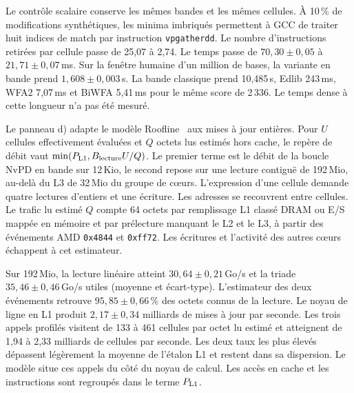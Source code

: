 Le contrôle scalaire conserve les mêmes bandes et les mêmes cellules. À 10\,\% de modifications synthétiques, les minima imbriqués permettent à GCC de traiter huit indices de match par instruction \texttt{vpgatherdd}. Le nombre d'instructions retirées par cellule passe de 25,07 à 2,74. Le temps passe de \(70{,}30\pm0{,}05\) à \(21{,}71\pm0{,}07\)\,ms. Sur la fenêtre humaine d'un million de bases, la variante en bande prend \(1{,}608\pm0{,}003\)\,s. La bande classique prend 10,485\,s, Edlib 243\,ms, WFA2 7,07\,ms et BiWFA 5,41\,ms pour le même score de 2\,336. Le temps dense à cette longueur n'a pas été mesuré.

Le panneau d) adapte le modèle Roofline~\cite{roofline} aux mises à jour entières. Pour \(U\) cellules effectivement évaluées et \(Q\) octets lus estimés hors cache, le repère de débit vaut \(\min(P_{\rm L1}, B_{\rm lecture} U/Q)\). Le premier terme est le débit de la boucle NvPD en bande sur 12\,Kio, le second repose sur une lecture contiguë de 192\,Mio, au-delà du L3 de 32\,Mio du groupe de cœurs. L'expression d'une cellule demande quatre lectures d'entiers et une écriture. Les adresses se recouvrent entre cellules. Le trafic lu estimé \(Q\) compte 64 octets par remplissage L1 classé DRAM ou E/S mappée en mémoire et par prélecture manquant le L2 et le L3, à partir des événements AMD \texttt{0x4844} et \texttt{0xff72}. Les écritures et l'activité des autres cœurs échappent à cet estimateur.

Sur 192\,Mio, la lecture linéaire atteint \(30{,}64\pm0{,}21\)\,Go/s et la triade \(35{,}46\pm0{,}46\)\,Go/s utiles (moyenne et écart-type). L'estimateur des deux événements retrouve \(95{,}85\pm0{,}66\)\,\% des octets connus de la lecture. Le noyau de ligne en L1 produit \(2{,}17\pm0{,}34\) milliards de mises à jour par seconde. Les trois appels profilés visitent de 133 à 461 cellules par octet lu estimé et atteignent de 1,94 à 2,33 milliards de cellules par seconde. Les deux taux les plus élevés dépassent légèrement la moyenne de l'étalon L1 et restent dans sa dispersion. Le modèle situe ces appels du côté du noyau de calcul. Les accès en cache et les instructions sont regroupés dans le terme \(P_{\rm L1}\).

